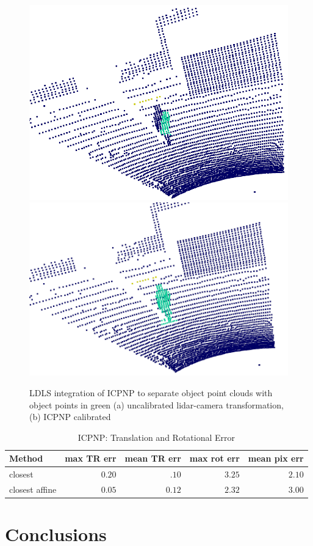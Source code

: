 \documentclass{article}
\begin{document}
\begin{figure}[]
    \centering
    \includegraphics[width=0.45\columnwidth]{images/ldls_init.png}
    \includegraphics[width=0.45\columnwidth]{images/ldls_caliberated.png}
    \caption{LDLS integration of ICPNP to separate object point clouds with object points in green (a) uncalibrated lidar-camera transformation, (b) ICPNP calibrated}
    \label{fig:framework}
\end{figure}   

\begin{table}
    \caption{ICPNP: Translation and Rotational Error}
    \label{tab:results}
        \toprule
    \begin{tabularx}{\textwidth}{l r r r r}
        \toprule
        Method & max TR err & mean TR err & max rot err & mean pix err \\
        \midrule
        closest & $  0.20$ & $ .10$ & $  3.25$ & $  2.10$  \\
        closest affine  & $ 0.05$ & $0.12$ & $ 2.32$ & $ 3.00$  \\

        \bottomrule
    \end{tabularx}
\end{table}
\section{Conclusions}


\end{document}
